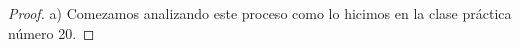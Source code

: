 \documentclass{article}
\DeclareMathOperator{\prob}{\mathbb{P}}
\DeclareMathOperator{\Exp}{\mathbb{E}}
\DeclareMathOperator{\Exponential}{\text{Exp}}
\DeclareMathOperator*{\argmin}{\text{argmín}}
\newcommand{\naturalnum}{\mathbb{N}}
\theoremstyle{definition}
\begin{document}
\begin{proof} a)
Comezamos analizando este proceso como lo hicimos en la clase práctica número 20.







\end{proof}
\end{document}
